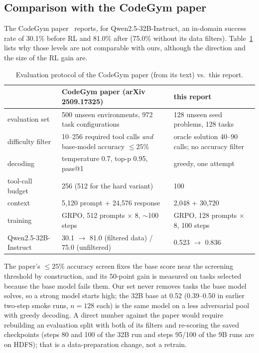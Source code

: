 \documentclass[11pt]{article}
\begin{document}
\subsection{Comparison with the CodeGym paper}\label{sec:paper}
The CodeGym paper~\cite{codegym} reports, for Qwen2.5-32B-Instruct, an in-domain success rate of 30.1\% before RL and 81.0\% after (75.0\% without its data filters). Table~\ref{tab:paper} lists why those levels are not comparable with ours, although the direction and the size of the RL gain are.
\begin{table}[h]\centering\small
\caption{Evaluation protocol of the CodeGym paper (from its text) vs.\ this report.}
\label{tab:paper}
\begin{tabular}{@{}p{3.2cm}p{6.2cm}p{6.2cm}@{}}\toprule
 & CodeGym paper (arXiv 2509.17325) & this report\\ \midrule
evaluation set & 500 unseen environments, 972 task configurations & 128 unseen seed problems, 128 tasks\\
difficulty filter & 10--256 required tool calls \emph{and} base-model accuracy $\le 25\%$ & oracle solution 40--90 calls; no accuracy filter\\
decoding & temperature 0.7, top-p 0.95, pass@1 & greedy, one attempt\\
tool-call budget & 256 (512 for the hard variant) & 100\\
context & 5{,}120 prompt $+$ 24{,}576 response & 2{,}048 $+$ 30{,}720\\
training & GRPO, 512 prompts $\times$ 8, $\sim$100 steps & GRPO, 128 prompts $\times$ 8, 100 steps\\
Qwen2.5-32B-Instruct & 30.1 $\to$ 81.0 (filtered data) / 75.0 (unfiltered) & 0.523 $\to$ 0.836\\
\bottomrule\end{tabular}
\end{table}
The paper's $\le 25\%$ accuracy screen fixes the base score near the screening threshold by construction, and its 50-point gain is measured on tasks selected because the base model fails them. Our set never removes tasks the base model solves, so a strong model starts high; the 32B base at 0.52 (0.39--0.50 in earlier two-step smoke runs, $n=128$ each) is the same model on a less adversarial pool with greedy decoding. A direct number against the paper would require rebuilding an evaluation split with both of its filters and re-scoring the saved checkpoints (steps 80 and 100 of the 32B run and steps 95/100 of the 9B runs are on HDFS); that is a data-preparation change, not a retrain.
\end{document}
